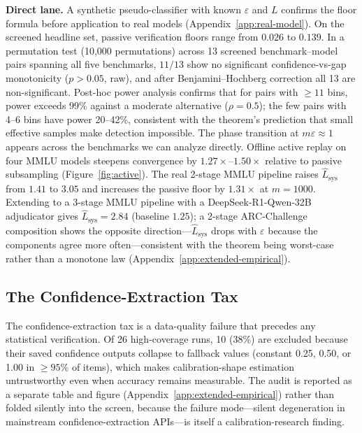 \documentclass{article}
\newcommand{\Lip}{L}
\newcommand{\errrate}{\varepsilon}
\newcommand{\nsamples}{m}
\theoremstyle{definition}
\begin{document}
\textbf{Direct lane.} A synthetic pseudo-classifier with known $\errrate$ and $\Lip$ confirms the floor formula before application to real models (Appendix~\ref{app:real-model}). On the screened headline set, passive verification floors range from $0.026$ to $0.139$. In a permutation test (10{,}000 permutations) across 13 screened benchmark--model pairs spanning all five benchmarks, $11/13$ show no significant confidence-vs-gap monotonicity ($p>0.05$, raw), and after Benjamini--Hochberg correction all 13 are non-significant. Post-hoc power analysis confirms that for pairs with ${\geq}11$ bins, power exceeds 99\% against a moderate alternative ($\rho{=}0.5$); the few pairs with 4--6 bins have power 20--42\%, consistent with the theorem's prediction that small effective samples make detection impossible. The phase transition at $\nsamples \errrate \approx 1$ appears across the benchmarks we can analyze directly. Offline active replay on four MMLU models steepens convergence by $1.27\times$--$1.50\times$ relative to passive subsampling (Figure~\ref{fig:active}). The real 2-stage MMLU pipeline raises $\hat\Lip_{\mathrm{sys}}$ from $1.41$ to $3.05$ and increases the passive floor by $1.31\times$ at $m{=}1000$. Extending to a 3-stage MMLU pipeline with a DeepSeek-R1-Qwen-32B adjudicator gives $\hat\Lip_{\mathrm{sys}} = 2.84$ (baseline $1.25$); a 2-stage ARC-Challenge composition shows the opposite direction---$\hat\Lip_{\mathrm{sys}}$ drops with $\errrate$ because the components agree more often---consistent with the theorem being worst-case rather than a monotone law (Appendix~\ref{app:extended-empirical}).

\subsection{The Confidence-Extraction Tax}
\label{sec:confidence-tax}

The confidence-extraction tax is a data-quality failure that precedes any statistical verification. Of 26 high-coverage runs, 10 (38\%) are excluded because their saved confidence outputs collapse to fallback values (constant 0.25, 0.50, or 1.00 in $\geq 95\%$ of items), which makes calibration-shape estimation untrustworthy even when accuracy remains measurable. The audit is reported as a separate table and figure (Appendix~\ref{app:extended-empirical}) rather than folded silently into the screen, because the failure mode---silent degeneration in mainstream confidence-extraction APIs---is itself a calibration-research finding.
\end{document}
